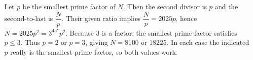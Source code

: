 Let $p$ be the smallest prime factor of $N$. Then the second divisor is $p$ and the second-to-last is $\dfrac{N}{p}$. Their given ratio implies $\dfrac{N}{p}=2025p$, hence $N=2025p^2=3^45^2p^2$. Because $3$ is a factor, the smallest prime factor satisfies $p\le3$. Thus $p=2$ or $p=3$, giving $\boxed{N=8100\text{ or }18225}$. In each case the indicated $p$ really is the smallest prime factor, so both values work.
